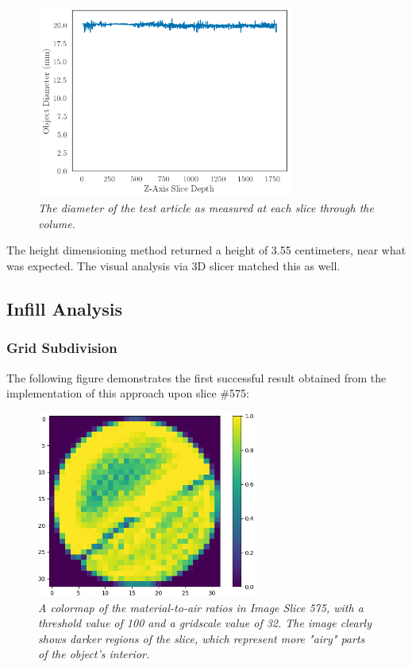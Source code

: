 \documentclass[11pt, letterpaper]{article}
\begin{document}
    \begin{figure}[H]
        \centering
        \label{fig:diameter}
        \includegraphics[width=0.75\textwidth]{diameters.png}
        \caption{\emph{The diameter of the test article as measured at each slice through the volume.}}
    \end{figure}

    The height dimensioning method returned a height of 3.55 centimeters, near what was expected. The visual analysis via 3D slicer matched this as well.

\subsection{Infill Analysis}
\subsubsection{Grid Subdivision}
The following figure demonstrates the first successful result obtained from the implementation of this approach upon slice \#575:

\begin{figure}[H]
 \centering
 \includegraphics[width=0.65\textwidth]{images/575ratios.png}
 \caption{\textit{A colormap of the material-to-air ratios in Image Slice 575, with a threshold value of 100 and a gridscale value of 32. The image clearly shows darker regions of the slice, which represent more "airy" parts of the object's interior.}}
 \label{fig:575ratios}
\end{figure}
\end{document}

